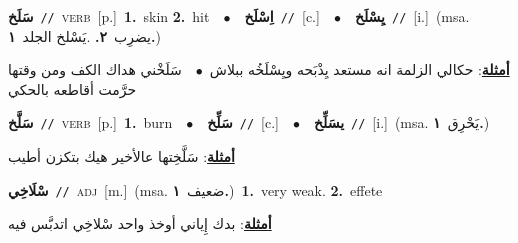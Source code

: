 \documentclass[10pt,a4paper,twoside]{article} %
\begin{document}
\begin{multicols}{2}
{\setlength\topsep{0pt}\textbf{\foreignlanguage{arabic}{سَلَخ}}\ {\color{gray}\texttt{//}\color{black}}\ \textsc{verb}\ [p.]\ \textbf{1.}~skin  \textbf{2.}~hit\ \ $\bullet$\ \ \setlength\topsep{0pt}\textbf{\foreignlanguage{arabic}{اِسْلَخ}}\ {\color{gray}\texttt{//}\color{black}}\ [c.]\ \ $\bullet$\ \ \setlength\topsep{0pt}\textbf{\foreignlanguage{arabic}{يِسْلَخ}}\ {\color{gray}\texttt{//}\color{black}}\ [i.]\ \color{gray}(msa. \foreignlanguage{arabic}{يضرِب}~\foreignlanguage{arabic}{\textbf{٢.}}  .\foreignlanguage{arabic}{يَسْلخ الجلد}~\foreignlanguage{arabic}{\textbf{١.}})\color{black}\  \begin{flushright}\color{gray}\foreignlanguage{arabic}{\textbf{\underline{\foreignlanguage{arabic}{أمثلة}}}: حكالي الزلمة انه مستعد يِذْبَحه ويِسْلَخُه ببلاش\ $\bullet$\ \  سَلَخْني هداك الكف ومن وقتها حرَّمت أقاطعه بالحكي}\end{flushright}\color{black}} \vspace{2mm}

{\setlength\topsep{0pt}\textbf{\foreignlanguage{arabic}{سَلَّخ}}\ {\color{gray}\texttt{//}\color{black}}\ \textsc{verb}\ [p.]\ \textbf{1.}~burn\ \ $\bullet$\ \ \setlength\topsep{0pt}\textbf{\foreignlanguage{arabic}{سَلِّخ}}\ {\color{gray}\texttt{//}\color{black}}\ [c.]\ \ $\bullet$\ \ \setlength\topsep{0pt}\textbf{\foreignlanguage{arabic}{يسَلِّخ}}\ {\color{gray}\texttt{//}\color{black}}\ [i.]\ \color{gray}(msa. \foreignlanguage{arabic}{يَحْرِق}~\foreignlanguage{arabic}{\textbf{١.}})\color{black}\  \begin{flushright}\color{gray}\foreignlanguage{arabic}{\textbf{\underline{\foreignlanguage{arabic}{أمثلة}}}: سَلَّخِتها عالأخير هيك بتكزن أطيب}\end{flushright}\color{black}} \vspace{2mm}

{\setlength\topsep{0pt}\textbf{\foreignlanguage{arabic}{سْلَاخِي}}\ {\color{gray}\texttt{//}\color{black}}\ \textsc{adj}\ [m.]\ \color{gray}(msa. \foreignlanguage{arabic}{ضعيف}~\foreignlanguage{arabic}{\textbf{١.}})\color{black}\ \textbf{1.}~very weak.  \textbf{2.}~effete\  \begin{flushright}\color{gray}\foreignlanguage{arabic}{\textbf{\underline{\foreignlanguage{arabic}{أمثلة}}}: بدك إِياني أوخذ واحد سْلاخِي اتدبَّس فيه}\end{flushright}\color{black}} \vspace{2mm}


\end{multicols}
\end{document}
